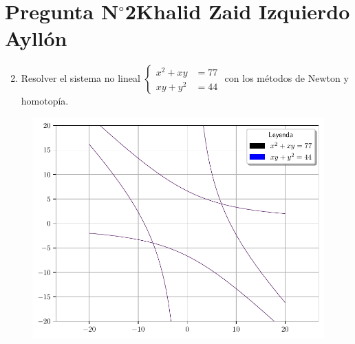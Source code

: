 \section{Pregunta N$^{\circ}$2\qquad Khalid Zaid Izquierdo Ayllón}

\begin{frame}
	
\end{frame}

\begin{frame}
	\begin{enumerate}\setcounter{enumi}{1}
		\item

		      Resolver el sistema no lineal
		      \begin{math}
			      \left\{
			      \begin{aligned}
				      x^{2} + xy  & = 77 \\
				      xy  + y^{2} & = 44
			      \end{aligned}
			      \right.
		      \end{math}
		      con los métodos de Newton y
		      homotopía.
	\end{enumerate}

	\begin{solution}
		\begin{figure}[ht!]
			\centering
			\includegraphics[width=0.5\paperwidth]{p2}
		\end{figure}
	\end{solution}
\end{frame}